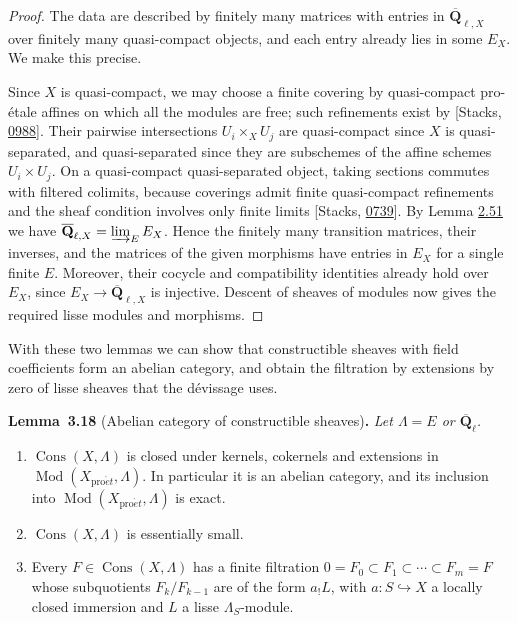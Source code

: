 \documentclass[11pt]{article}
\newenvironment{bpstatement}[2]{\par\addvspace{0.6\baselineskip}\noindent\textbf{#1}#2\textbf{.}\enspace\ignorespaces}
  {\par\addvspace{0.4\baselineskip}}
\newenvironment{bpstatementit}[2]{\begin{bpstatement}{#1}{#2}\itshape\ignorespaces}{\end{bpstatement}}
\providecommand{\Cons}{}\renewcommand{\Cons}{\operatorname{Cons}}
\providecommand{\QbarX}{}\renewcommand{\QbarX}{\overline{\mathbf Q}_{\ell,X}}
\begin{document}
\begin{proof}[{Proof}]\label{bp246}%
The data are described by finitely many matrices with entries in \(\QbarX\) over finitely many quasi-compact objects, and each entry already lies in some \(E_X\). We make this precise.

Since \(X\) is quasi-compact, we may choose a finite covering by quasi-compact pro-étale affines on which all the modules are free; such refinements exist by [Stacks, \href{https://stacks.math.columbia.edu/tag/0988}{0988}]. Their pairwise intersections \(U_i\times_XU_j\) are quasi-compact since \(X\) is quasi-separated, and quasi-separated since they are subschemes of the affine schemes \(U_i\times U_j\). On a quasi-compact quasi-separated object, taking sections commutes with filtered colimits, because coverings admit finite quasi-compact refinements and the sheaf condition involves only finite limits [Stacks, \href{https://stacks.math.columbia.edu/tag/0739}{0739}]. By Lemma \hyperref[bp158]{2.51} we have \(\QbarX=\varinjlim_EE_X\). Hence the finitely many transition matrices, their inverses, and the matrices of the given morphisms have entries in \(E_X\) for a single finite \(E\). Moreover, their cocycle and compatibility identities already hold over \(E_X\), since \(E_X\to\QbarX\) is injective. Descent of sheaves of modules now gives the required lisse modules and morphisms.
\end{proof}

\label{bp247}%
With these two lemmas we can show that constructible sheaves with field coefficients form an abelian category, and obtain the filtration by extensions by zero of lisse sheaves that the dévissage uses.

\label{bp248}%
\begin{bpstatementit}{Lemma~3.18}{ (Abelian category of constructible sheaves)}
Let \(\Lambda=E\) or \(\overline{\mathbf Q}_\ell\).

\begin{enumerate}
\item \(\Cons(X,\Lambda)\) is closed under kernels, cokernels and extensions in \(\operatorname{Mod}(X_{\mathrm{pro}\acute{e}t},\Lambda)\). In particular it is an abelian category, and its inclusion into \(\operatorname{Mod}(X_{\mathrm{pro}\acute{e}t},\Lambda)\) is exact.
\item \(\Cons(X,\Lambda)\) is essentially small.
\item Every \(F\in\Cons(X,\Lambda)\) has a finite filtration \(0=F_0\subset F_1\subset\cdots\subset F_m=F\) whose subquotients \(F_k/F_{k-1}\) are of the form \(a_!L\), with \(a:S\hookrightarrow X\) a locally closed immersion and \(L\) a lisse \(\Lambda_S\)-module.
\end{enumerate}
\end{bpstatementit}
\end{document}
